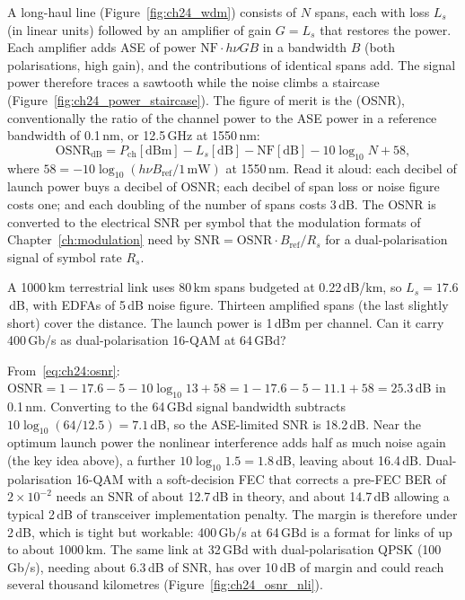 A long-haul line (Figure~\ref{fig:ch24_wdm}) consists of $N$ spans, each with loss $L_s$ (in linear units)
followed by an amplifier of gain $G=L_s$ that restores the power. Each amplifier adds ASE of power
$\mathrm{NF}\cdot h\nu G B$ in a bandwidth $B$ (both polarisations, high gain), and the contributions of
identical spans add. The signal power therefore traces a sawtooth while the noise climbs a staircase
(Figure~\ref{fig:ch24_power_staircase}). The figure of merit is the 
(OSNR), conventionally the ratio of the channel power to the ASE power in a reference bandwidth of
0.1\,nm, or 12.5\,GHz at 1550\,nm:
\begin{equation}
\mathrm{OSNR}_{\mathrm{dB}}=P_{\mathrm{ch}}[\mathrm{dBm}]-L_s[\mathrm{dB}]-\mathrm{NF}[\mathrm{dB}]
-10\log_{10}N+58,
\label{eq:ch24:osnr}
\end{equation}
where $58=-10\log_{10}(h\nu B_{\mathrm{ref}}/1\,\mathrm{mW})$ at 1550\,nm. Read it aloud: each decibel of
launch power buys a decibel of OSNR; each decibel of span loss or noise figure costs one; and each
doubling of the number of spans costs 3\,dB. The OSNR is converted to the electrical SNR per symbol that
the modulation formats of Chapter~\ref{ch:modulation} need by
$\mathrm{SNR}=\mathrm{OSNR}\cdot B_{\mathrm{ref}}/R_s$ for a dual-polarisation signal of symbol rate $R_s$.


\begin{worked}
A 1000\,km terrestrial link uses 80\,km spans budgeted at 0.22\,dB/km, so $L_s=17.6$\,dB, with EDFAs of 5\,dB
noise figure. Thirteen amplified spans (the last slightly short) cover the distance. The launch power is
1\,dBm per channel. Can it carry 400\,Gb/s as dual-polarisation 16-QAM at 64\,GBd?

From~\eqref{eq:ch24:osnr}: $\mathrm{OSNR}=1-17.6-5-10\log_{10}13+58=1-17.6-5-11.1+58=25.3$\,dB in 0.1\,nm.
Converting to the 64\,GBd signal bandwidth subtracts $10\log_{10}(64/12.5)=7.1$\,dB, so the ASE-limited SNR
is 18.2\,dB. Near the optimum launch power the nonlinear interference adds half as much noise again
(the key idea above), a further $10\log_{10}1.5=1.8$\,dB, leaving about 16.4\,dB. Dual-polarisation 16-QAM
with a soft-decision FEC that corrects a pre-FEC BER of $2\times10^{-2}$ needs an SNR of about 12.7\,dB in
theory, and about 14.7\,dB allowing a typical 2\,dB of transceiver implementation penalty. The margin is
therefore under 2\,dB, which is tight but workable: 400\,Gb/s at 64\,GBd is a format for links of up to
about 1000\,km. The same link at 32\,GBd with dual-polarisation QPSK (100\,Gb/s), needing about 6.3\,dB of
SNR, has over 10\,dB of margin and could reach several thousand kilometres
(Figure~\ref{fig:ch24_osnr_nli}).
\end{worked}

